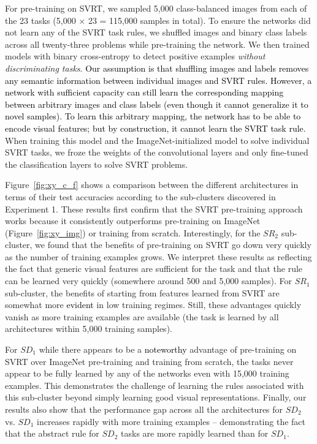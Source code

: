 For pre-training on SVRT, we sampled 5,000 class-balanced images from each of the 23 tasks (5,000 $\times$ 23 = 115,000 samples in total). To ensure the networks did not learn any of the SVRT task rules, we shuffled images and binary class labels across all twenty-three problems while pre-training the network. We then trained models with binary cross-entropy to detect positive examples \textit{without discriminating tasks}. \textcolor{black}{Our assumption is that shuffling images and labels removes any semantic information between individual images and SVRT rules. However, a network with sufficient capacity can still learn the corresponding mapping between arbitrary images and class labels (even though it cannot generalize it to novel samples). To learn this arbitrary mapping, the network has to be able to encode visual features; but by construction, it cannot learn the SVRT task rule.} When training this model and the ImageNet-initialized model to solve individual SVRT tasks, we froze the weights of the convolutional layers and only fine-tuned the classification layers to solve SVRT problems.

Figure~\ref{fig:xy_c_f} shows a comparison between the different architectures in terms of their test accuracies according to the sub-clusters discovered in Experiment 1. These results first confirm that the SVRT pre-training approach works because it consistently outperforms pre-training on ImageNet (Figure~\ref{fig:xy_img}) or training from scratch. Interestingly, for the $SR_{2}$ sub-cluster, we found that the benefits of pre-training on SVRT go down very quickly as the number of training examples grows. We interpret these results as reflecting the fact that generic visual features are sufficient for the task and that the rule can be learned very quickly (somewhere around 500 and 5,000 samples). For $SR_{1}$ sub-cluster, the benefits of starting from features learned from SVRT are somewhat more \textcolor{black}{evident} in low training regimes. Still, these advantages quickly vanish as more training examples are available (the task is learned by all architectures within 5,000 training samples). 

For $SD_{1}$ while there appears to be a \textcolor{black}{noteworthy} advantage of pre-training on SVRT over ImageNet pre-training and training from scratch, the tasks never appear to be fully learned by any of the networks even with 15,000 training examples. This demonstrates the challenge of learning the rules associated with this sub-cluster beyond simply learning good visual representations. Finally, our results also show that the performance gap across all the architectures for $SD_{2}$ vs. $SD_{1}$ increases rapidly with more training examples -- demonstrating the fact that the abstract rule for $SD_{2}$ tasks are more rapidly learned than for $SD_{1}$.


